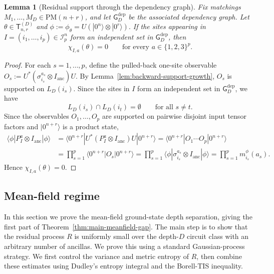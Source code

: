 \documentclass[12pt]{article}
\newtheorem{lemma}[theorem]{Lemma}
\newcommand{\mcI}{\mathcal{I}}
\begin{document}
\begin{lemma}[Residual support through the dependency graph]
\label{lem:residual-support-dependency-graph}
Fix matchings \(M_1,\dots,M_D \in \mathrm{PM}(n+r)\), and let $\mathsf G_D^{\mathrm{dep}}$ be the associated dependency graph. Let $\theta \in \mathsf{T}_{n,r}^{(D)}$ and $\phi:= \phi_\theta = U (| 0^n\rangle \otimes | 0^r\rangle).$ If the sites appearing in \(I=(i_1,\dots,i_p)\in\mcI_p^n\) form an independent
set in \(\mathsf G_D^{\mathrm{dep}}\), then
\[
    \chi_{I,a}(\theta)=0
    \qquad
    \text{for every }a\in\{1,2,3\}^p.
\]
\end{lemma}

\begin{proof}
For each \(s=1,\dots,p\), define the pulled-back one-site observable $O_s:=U^*(\sigma_{i_s}^{a_s}\otimes I_{\mathrm{anc}})U.$ By Lemma~\ref{lem:backward-support-growth}, \(O_s\) is supported on
\(L_D(i_s)\). Since the sites in $I$ form an independent set in $\mathsf{G}_D^{\mathrm{dep}}$, we have
\[
    L_D(i_s)\cap L_D(i_t)=\emptyset
    \qquad
    \text{for all }s\neq t .
\]
Since the observables \(O_1,\dots,O_p\) are supported on pairwise disjoint
input tensor factors and \(|0^{n+r}\rangle\) is a product state,
\begin{align*}
\langle\phi|P_I^a\otimes I_{\mathrm{anc}}|\phi\rangle
&=
\langle 0^{n+r}|U^*(P_I^a\otimes I_{\mathrm{anc}})U|0^{n+r}\rangle  
=
\langle 0^{n+r}|O_1\cdots O_p|0^{n+r}\rangle  \\
&=
\prod_{s=1}^p
\langle 0^{n+r}|O_s|0^{n+r}\rangle  
=
\prod_{s=1}^p
\langle\phi|\sigma_{i_s}^{a_s}\otimes I_{\mathrm{anc}}|\phi\rangle
=
\prod_{s=1}^p m_{i_s}^\phi(a_s).
\end{align*}
Hence \(\chi_{I,a}(\theta)=0\).
\end{proof}



\subsection{Mean-field regime} \label{ssec:mean-field-regime}

In this section we prove the mean-field ground-state depth separation, giving the first part of
Theorem~\ref{thm:main-meanfield-gap}. The main step is to show that the residual
process $R$ is uniformly small over the depth-\(D\) circuit class with an
arbitrary number of ancillas. We prove this using a standard Gaussian-process
strategy. We first control the variance and metric entropy of $R$, then combine these estimates using Dudley's entropy integral and the Borell-TIS inequality.
\end{document}
